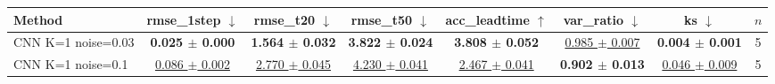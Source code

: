 \begin{tabular}{lccccccc}
\toprule
Method & rmse\_1step $\downarrow$ & rmse\_t20 $\downarrow$ & rmse\_t50 $\downarrow$ & acc\_leadtime $\uparrow$ & var\_ratio $\downarrow$ & ks $\downarrow$ & $n$ \\
\midrule
CNN K=1 noise=0.03 & \textbf{0.025 $\pm$ 0.000} & \textbf{1.564 $\pm$ 0.032} & \textbf{3.822 $\pm$ 0.024} & \textbf{3.808 $\pm$ 0.052} & \underline{0.985 $\pm$ 0.007} & \textbf{0.004 $\pm$ 0.001} & 5 \\
CNN K=1 noise=0.1 & \underline{0.086 $\pm$ 0.002} & \underline{2.770 $\pm$ 0.045} & \underline{4.230 $\pm$ 0.041} & \underline{2.467 $\pm$ 0.041} & \textbf{0.902 $\pm$ 0.013} & \underline{0.046 $\pm$ 0.009} & 5 \\
\bottomrule
\end{tabular}
